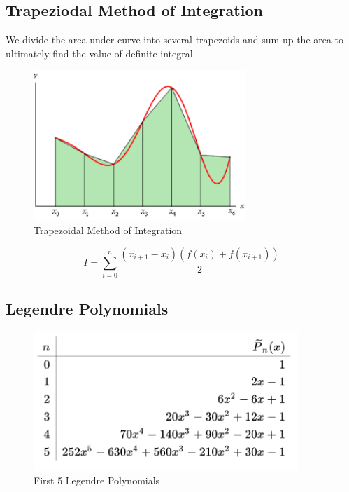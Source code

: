 \documentclass[12pt]{article}
\begin{document}
\subsection{Trapeziodal Method of Integration}
We divide the area under curve into several trapezoids and sum up the area to ultimately find the value of definite integral.
\begin{figure}[H]
    \centering
    \includegraphics[width=8cm]{trap.png}
    \caption{Trapezoidal Method of Integration}
\end{figure}
\begin{equation*}
    I = \sum^n_{i=0} \frac{(x_{i+1}-x_{i})(f(x_i) + f(x_{i+1}))}{2}
\end{equation*}

\subsection*{Legendre Polynomials}
\begin{figure}[H]
    \centering
    \includegraphics[width=10cm]{leg.png}
    \caption{First 5 Legendre Polynomials}
\end{figure}
\end{document}
